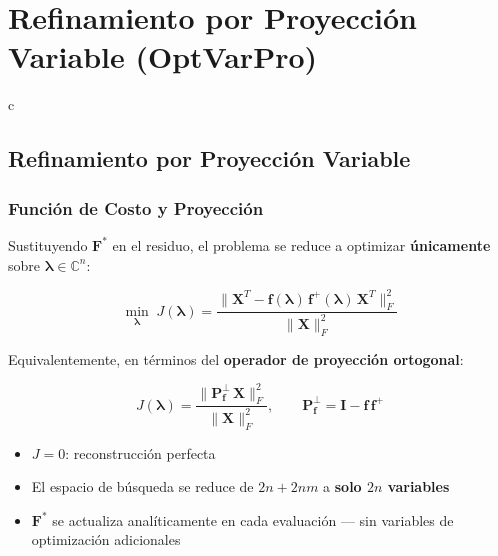 \section{Refinamiento por Proyección Variable (OptVarPro)}

c

\subsection{Refinamiento por Proyección Variable}
\subsubsection{Función de Costo y Proyección}

Sustituyendo $\mathbf{F}^*$ en el residuo, el problema se reduce a optimizar \textbf{únicamente} sobre $\bm{\lambda} \in \mathbb{C}^n$:

\begin{equation}
    \min_{\bm{\lambda}}\; J(\bm{\lambda}) =
    \frac{\bigl\|\mathbf{X}^T - \mathbf{f}(\bm{\lambda})\,\mathbf{f}^+(\bm{\lambda})\,\mathbf{X}^T\bigr\|_F^2}
         {\|\mathbf{X}\|_F^2}
    \label{eq:varpro_cost}
\end{equation}

Equivalentemente, en términos del \textbf{operador de proyección ortogonal}:

\begin{equation}
    J(\bm{\lambda}) = \frac{\bigl\|\mathbf{P}_{\mathbf{f}}^\perp\,\mathbf{X}\bigr\|_F^2}{\|\mathbf{X}\|_F^2},
    \qquad
    \mathbf{P}_{\mathbf{f}}^\perp = \mathbf{I} - \mathbf{f}\,\mathbf{f}^+
    \label{eq:projection}
\end{equation}

\begin{itemize}
    \item $J = 0$: reconstrucción perfecta
    \item El espacio de búsqueda se reduce de $2n + 2nm$ a \textbf{solo $2n$ variables}
    \item $\mathbf{F}^*$ se actualiza analíticamente en cada evaluación — sin variables de optimización adicionales
\end{itemize}


